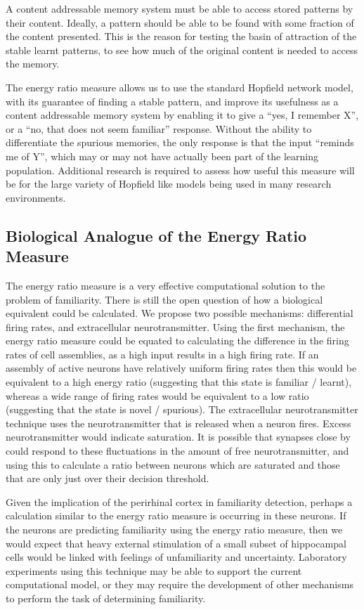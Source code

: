 A content addressable memory system must be able to access stored patterns by their content.  Ideally, a pattern should be able to be found with some fraction of the content presented.  This is the reason for testing the basin of attraction of the stable learnt patterns, to see how much of the original content is needed to access the memory.  

The energy ratio measure allows us to use the standard Hopfield network model, with its guarantee of finding a stable pattern, and improve its usefulness as a content addressable memory system by enabling it to give a ``yes, I remember X'', or a ``no, that does not seem familiar'' response.  Without the ability to differentiate the spurious memories, the only response is that the input ``reminds me of Y'', which may or may not have actually been part of the learning population.  Additional research is required to assess how useful this measure will be for the large variety of Hopfield like models being used in many research environments.  

\subsection{Biological Analogue of the Energy Ratio Measure}

The energy ratio measure is a very effective computational solution to the problem of familiarity.  There is still the open question of how a biological equivalent could be calculated.  We propose two possible mechanisms: differential firing rates, and extracellular neurotransmitter.  Using the first mechanism, the energy ratio measure could be equated to calculating the difference in the firing rates of cell assemblies, as a high input results in a high firing rate.  If an assembly of active neurons have relatively uniform firing rates then this would be equivalent to a high energy ratio (suggesting that this state is familiar / learnt), whereas a wide range of firing rates would be equivalent to a low ratio (suggesting that the state is novel / spurious).  The extracellular neurotransmitter technique uses the neurotransmitter that is released when a neuron fires. Excess neurotransmitter would indicate saturation. It is possible that synapses close by could respond to these fluctuations in the amount of free neurotransmitter, and using this to calculate a ratio between neurons which are saturated and those that are only just over their decision threshold.  

Given the implication of the perirhinal cortex in familiarity detection, perhaps a calculation similar to the energy ratio measure is occurring in these neurons.  If the neurons are predicting familiarity using the energy ratio measure, then we would expect that heavy external stimulation of a small subset of hippocampal cells would be linked with feelings of unfamiliarity and uncertainty.  Laboratory experiments using this technique may be able to support the current computational model, or they may require the development of other mechanisms to perform the task of determining familiarity.

